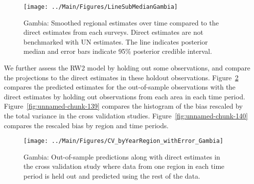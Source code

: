 \documentclass[12pt]{article}\usepackage[]{graphicx}\usepackage[]{color}
\newenvironment{knitrout}{}{} %
\begin{document}
\begin{knitrout}
\color{fgcolor}\begin{figure}[bht]

{\centering \texttt{[image: ../Main/Figures/LineSubMedianGambia]} 

}

\caption[Gambia]{Gambia: Smoothed regional estimates over time compared to the direct estimates from each surveys. Direct estimates are not benchmarked with UN estimates. The line indicates posterior median and error bars indicate 95\% posterior credible interval.}\label{fig:unnamed-chunk-137}
\end{figure}


\end{knitrout}
We further assess the RW2 model by holding out some observations, and compare the projections to the direct estimates in these holdout observations. Figure~\ref{fig:unnamed-chunk-138} compares the predicted estimates for the out-of-sample observations  with the direct estimates by holding out observations from each area in each time period.  Figure~\ref{fig:unnamed-chunk-139} compares the histogram of the bias rescaled by the total variance in the cross validation studies. Figure~\ref{fig:unnamed-chunk-140} compares the rescaled bias by region and time periods.



 
\begin{knitrout}
\color{fgcolor}\begin{figure}[bht]

{\centering \texttt{[image: ../Main/Figures/CV\_byYearRegion\_withError\_Gambia]} 

}

\caption[Gambia]{Gambia: Out-of-sample predictions along with direct estimates in the cross validation study where data from one region in each time period is held out and predicted using the rest of the data.}\label{fig:unnamed-chunk-138}
\end{figure}


\end{knitrout}
\end{document}
